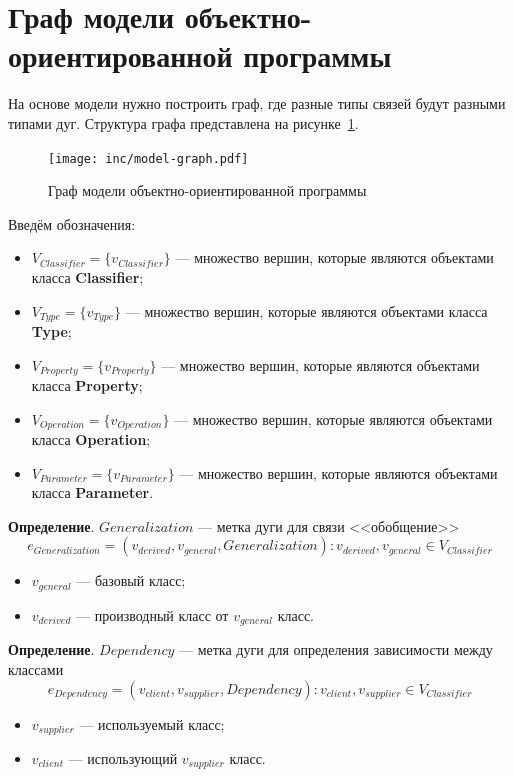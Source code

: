 \section{Граф модели объектно-ориентированной программы}

На основе модели нужно построить граф, где разные типы связей будут разными типами дуг.
Структура графа представлена на рисунке~\ref{fig:model-graph}.

\begin{figure}[!ht]
\centering
\texttt{[image: inc/model-graph.pdf]}
\caption{Граф модели объектно-ориентированной программы}
\label{fig:model-graph}
\end{figure}

Введём обозначения:
\begin{itemize}
\item $V_{Classifier} = \{ v_{Classifier} \}$ --- множество вершин, которые являются объектами класса \textbf{Classifier};
\item $V_{Type} = \{ v_{Type} \}$ --- множество вершин, которые являются объектами класса \textbf{Type};
\item $V_{Property} = \{ v_{Property} \}$ --- множество вершин, которые являются объектами класса \textbf{Property};
\item $V_{Operation} = \{ v_{Operation} \}$ --- множество вершин, которые являются объектами класса \textbf{Operation};
\item $V_{Parameter} = \{ v_{Parameter} \}$ --- множество вершин, которые являются объектами класса \textbf{Parameter}.
\end{itemize}

\textbf{Определение}. $Generalization$ --- метка дуги для связи <<обобщение>>
%
$$e_{Generalization} = (v_{derived}, v_{general}, Generalization) : v_{derived}, v_{general} \in V_{Classifier}$$

\begin{itemize}
\item $v_{general}$ --- базовый класс;
\item $v_{derived}$ --- производный класс от $v_{general}$ класс.
\end{itemize}

\textbf{Определение}. $Dependency$ --- метка дуги для определения зависимости
между классами
%
$$e_{Dependency} = (v_{client}, v_{supplier}, Dependency) : v_{client}, v_{supplier} \in V_{Classifier}$$

\begin{itemize}
\item $v_{supplier}$ --- используемый класс;
\item $v_{client}$ --- использующий $v_{supplier}$ класс.
\end{itemize}

